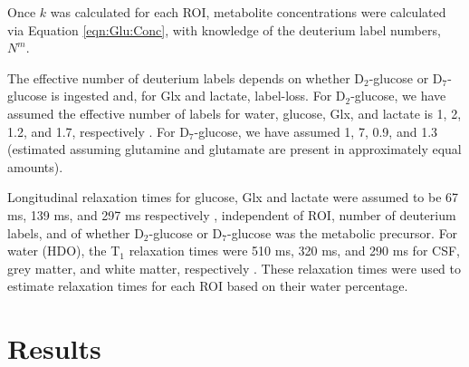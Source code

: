 \documentclass[class=article, crop=false]{standalone}
\begin{document}
Once $k$ was calculated for each ROI, metabolite concentrations were calculated via Equation \ref{eqn:Glu:Conc}, with knowledge of the deuterium label numbers, $N^m$.

The effective number of deuterium labels depends on whether D$_2$-glucose or D$_7$-glucose is ingested and, for Glx and lactate, label-loss. For D$_2$-glucose, we have assumed the effective number of labels for water, glucose, Glx, and lactate is 1, 2, 1.2, and 1.7, respectively \cite{DeGraaf2021CharacterizationStudies}. For D$_7$-glucose, we have assumed 1, 7, 0.9, and 1.3 (estimated \cite{Funk2017TheGlucose} assuming glutamine and glutamate are present in approximately equal amounts). 

Longitudinal relaxation times for glucose, Glx and lactate were assumed to be 67 ms, 139 ms, and 297 ms respectively \cite{DeFeyter2018DeuteriumVivo}, independent of ROI, number of deuterium labels, and of whether D$_2$-glucose or D$_7$-glucose was the metabolic precursor. For water (HDO), the T$_1$ relaxation times were 510 ms, 320 ms, and 290 ms for CSF, grey matter, and white matter, respectively \cite{Cocking2023DeuteriumDosing}. These relaxation times were used to estimate relaxation times for each ROI based on their water percentage.

\section{Results}
\end{document}
